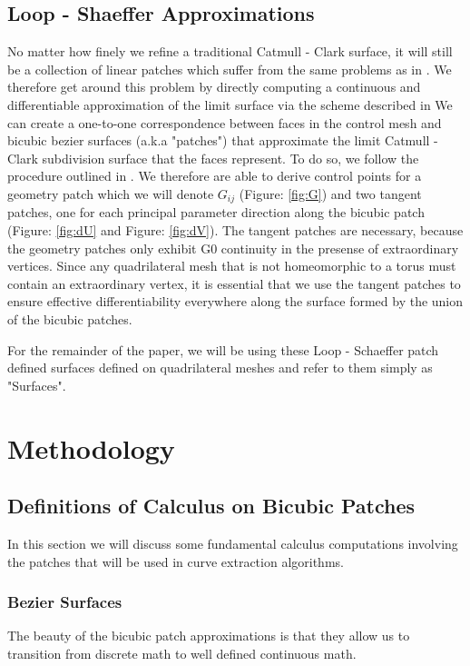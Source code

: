 \documentclass[12pt, letterpaper]{article}
\begin{document}
	\newpage

	\subsection{Loop - Shaeffer Approximations}
	
		No matter how finely we refine a traditional Catmull - Clark surface, it will still be a collection of linear patches which suffer from the same problems as 
		in \cite{Eisemann08}.  We therefore get around this problem by directly computing a continuous and differentiable approximation of the limit surface
		via the scheme described in \cite{Loop}
		We can create a one-to-one correspondence between faces in the control mesh and bicubic bezier surfaces (a.k.a "patches") that approximate the 
		limit Catmull - Clark subdivision surface that the faces represent.
		To do so, we follow the procedure outlined in \cite{Loop}.
		We therefore are able to derive control points for a geometry patch which we will denote $G_{ij}$ (Figure: \ref{fig:G}) and two tangent patches, 
		one for each principal parameter direction along the bicubic patch (Figure: \ref{fig:dU} and Figure: \ref{fig:dV}).
		The tangent patches are necessary, because the geometry patches only exhibit G0 continuity in the presense of extraordinary vertices.
		Since any quadrilateral mesh that is not homeomorphic to a torus must contain an extraordinary vertex,
		it is essential that we use the tangent patches to ensure effective differentiability everywhere along the surface formed by the union of the bicubic patches.
		
		For the remainder of the paper, we will be using these Loop - Schaeffer patch defined surfaces defined on quadrilateral meshes and refer to them simply as "Surfaces".



\section{Methodology}

	\subsection{Definitions of Calculus on Bicubic Patches}
	
	In this section we will discuss some fundamental calculus computations involving the patches that will be used in curve extraction algorithms.
	
		\subsubsection{Bezier Surfaces}
		The beauty of the bicubic patch approximations is that they allow us to transition from discrete math to well defined continuous math.
		
\end{document}
